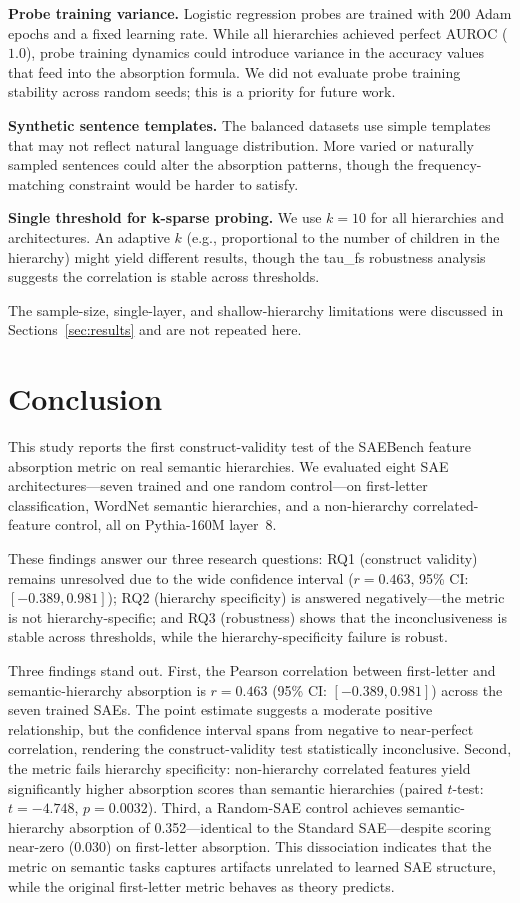 \documentclass{article}
\begin{document}
\textbf{Probe training variance.} Logistic regression probes are trained with 200 Adam epochs and a fixed learning rate. While all hierarchies achieved perfect AUROC ($1.0$), probe training dynamics could introduce variance in the accuracy values that feed into the absorption formula. We did not evaluate probe training stability across random seeds; this is a priority for future work.

\textbf{Synthetic sentence templates.} The balanced datasets use simple templates that may not reflect natural language distribution. More varied or naturally sampled sentences could alter the absorption patterns, though the frequency-matching constraint would be harder to satisfy.

\textbf{Single threshold for k-sparse probing.} We use $k = 10$ for all hierarchies and architectures. An adaptive $k$ (e.g., proportional to the number of children in the hierarchy) might yield different results, though the tau\_fs robustness analysis suggests the correlation is stable across thresholds.

The sample-size, single-layer, and shallow-hierarchy limitations were discussed in Sections~\ref{sec:results} and are not repeated here.

\section{Conclusion}
\label{sec:conclusion}

This study reports the first construct-validity test of the SAEBench feature absorption metric on real semantic hierarchies. We evaluated eight SAE architectures---seven trained and one random control---on first-letter classification, WordNet semantic hierarchies, and a non-hierarchy correlated-feature control, all on Pythia-160M layer~8.

These findings answer our three research questions: RQ1 (construct validity) remains unresolved due to the wide confidence interval ($r = 0.463$, 95\% CI: $[-0.389, 0.981]$); RQ2 (hierarchy specificity) is answered negatively---the metric is not hierarchy-specific; and RQ3 (robustness) shows that the inconclusiveness is stable across thresholds, while the hierarchy-specificity failure is robust.

Three findings stand out. First, the Pearson correlation between first-letter and semantic-hierarchy absorption is $r = 0.463$ (95\% CI: $[-0.389, 0.981]$) across the seven trained SAEs. The point estimate suggests a moderate positive relationship, but the confidence interval spans from negative to near-perfect correlation, rendering the construct-validity test statistically inconclusive. Second, the metric fails hierarchy specificity: non-hierarchy correlated features yield significantly higher absorption scores than semantic hierarchies (paired $t$-test: $t = -4.748$, $p = 0.0032$). Third, a Random-SAE control achieves semantic-hierarchy absorption of 0.352---identical to the Standard SAE---despite scoring near-zero (0.030) on first-letter absorption. This dissociation indicates that the metric on semantic tasks captures artifacts unrelated to learned SAE structure, while the original first-letter metric behaves as theory predicts.
\end{document}

